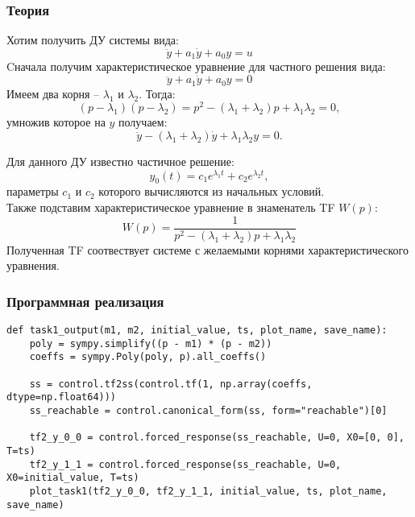 \documentclass[16pt]{article}
\begin{document}
\subsubsection{Теория}
Хотим получить ДУ системы вида:
\[\ddot{y} + a_1\dot{y} + a_0y = u\]
Cначала получим характеристическое уравнение для частного решения вида:
\[\ddot{y} + a_1\dot{y} + a_0y = 0\]
Имеем два корня -- \(\lambda_1\) и \(\lambda_2\). Тогда:
\[ (p - \lambda_1)(p-\lambda_2) = p^2 - (\lambda_1 + \lambda_2)p + \lambda_1\lambda_2 = 0,\]
умножив которое на \(y\) получаем:
\[\ddot{y} - (\lambda_1 + \lambda_2)\dot{y} + \lambda_1\lambda_2y = 0.\]

Для данного ДУ известно частичное решение:
\[ y_{0}(t) = c_1 e^{\lambda_1 t} + c_2 e^{\lambda_2 t},\]
параметры \(c_1\) и \(c_2\) которого вычисляются из начальных условий.
\\
Также подставим характеристическое уравнение в знаменатель TF \(W(p)\):
\[W(p) = \frac{1}{p^2 - (\lambda_1 + \lambda_2)p + \lambda_1\lambda_2}\]
Полученная TF соотвествует системе с желаемыми корнями характеристического уравнения.
\subsubsection{Программная реализация}
\begin{verbatim}
def task1_output(m1, m2, initial_value, ts, plot_name, save_name):
    poly = sympy.simplify((p - m1) * (p - m2))
    coeffs = sympy.Poly(poly, p).all_coeffs()
    
    ss = control.tf2ss(control.tf(1, np.array(coeffs, dtype=np.float64)))
    ss_reachable = control.canonical_form(ss, form="reachable")[0]

    tf2_y_0_0 = control.forced_response(ss_reachable, U=0, X0=[0, 0], T=ts)
    tf2_y_1_1 = control.forced_response(ss_reachable, U=0, X0=initial_value, T=ts)
    plot_task1(tf2_y_0_0, tf2_y_1_1, initial_value, ts, plot_name, save_name)
\end{verbatim}
\end{document}
